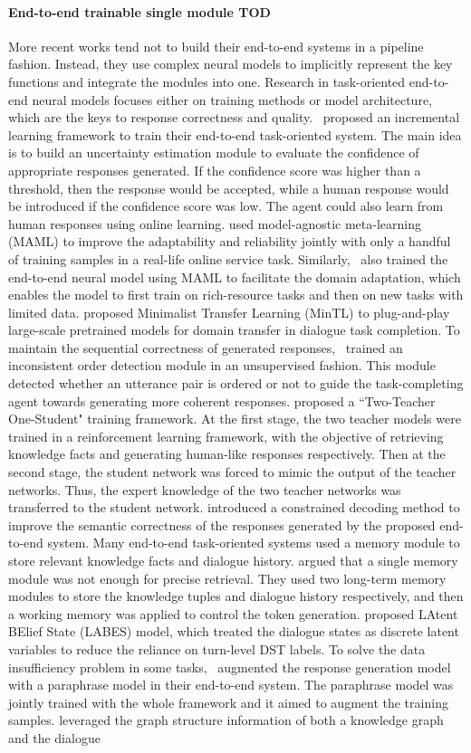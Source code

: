 \paragraph*{End-to-end trainable single module TOD} More recent works tend not to build their end-to-end systems in a pipeline fashion. Instead, they use complex neural models to implicitly represent the key functions and integrate the modules into one. Research in task-oriented end-to-end neural models focuses either on training methods or model architecture, which are the keys to response correctness and quality.~ proposed an incremental learning framework to train their end-to-end task-oriented system. The main idea is to build an uncertainty estimation module to evaluate the confidence of appropriate responses generated. If the confidence score was higher than a threshold, then the response would be accepted, while a human response would be introduced if the confidence score was low. The agent could also learn from human responses using online learning.  used model-agnostic meta-learning (MAML) to improve the adaptability and reliability jointly with only a handful of training samples in a real-life online service task. Similarly,~ also trained the end-to-end neural model using MAML to facilitate the domain adaptation, which enables the model to first train on rich-resource tasks and then on new tasks with limited data.  proposed Minimalist Transfer Learning (MinTL) to plug-and-play large-scale pretrained models for domain transfer in dialogue task completion. To maintain the sequential correctness of generated responses,~ trained an inconsistent order detection module in an unsupervised fashion. This module detected whether an utterance pair is ordered or not to guide the task-completing agent towards generating more coherent responses.  proposed a ``Two-Teacher One-Student" training framework. At the first stage, the two teacher models were trained in a reinforcement learning framework, with the objective of retrieving knowledge facts and generating human-like responses respectively. Then at the second stage, the student network was forced to mimic the output of the teacher networks. Thus, the expert knowledge of the two teacher networks was transferred to the student network.  introduced a constrained decoding method to improve the semantic correctness of the responses generated by the proposed end-to-end system. Many end-to-end task-oriented systems used a memory module to store relevant knowledge facts and dialogue history.  argued that a single memory module was not enough for precise retrieval. They used two long-term memory modules to store the knowledge tuples and dialogue history respectively, and then a working memory was applied to control the token generation.  proposed LAtent BElief State (LABES) model, which treated the dialogue states as discrete latent variables to reduce the reliance on turn-level DST labels. To solve the data insufficiency problem in some tasks,~ augmented the response generation model with a paraphrase model in their end-to-end system. The paraphrase model was jointly trained with the whole framework and it aimed to augment the training samples.  leveraged the graph structure information of both a knowledge graph and the dialogue 